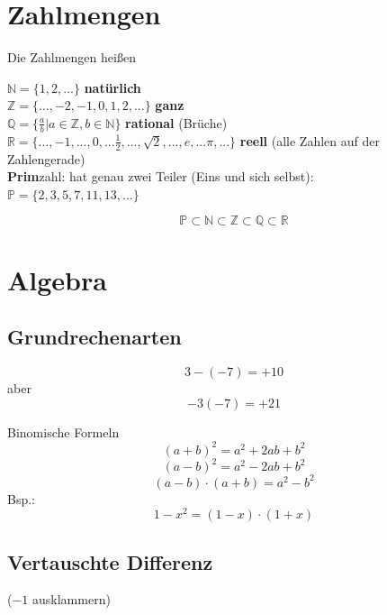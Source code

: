 \begin{multicols}{2}%

\section*{Zahlmengen}
\begin{definition*}{}{}
Die Zahlmengen heißen

$\mathbb{N} = \{1,2, ...\}$                                   \textbf{natürlich}\\
$\mathbb{Z} = \{..., -2, -1, 0, 1,2, ...\}$                   \textbf{ganz}\\
$\mathbb{Q} = \{\frac{a}b|a\in \mathbb{Z},b\in\mathbb{N}\}$   \textbf{rational} (Brüche)\\
$\mathbb{R} = \{..., -1, ..., 0, ... \frac12, ..., \sqrt{2}, ..., e, ... \pi, ...\}  $ \textbf{reell} (alle Zahlen auf der Zahlengerade)\\

\textbf{Prim}zahl: hat genau zwei Teiler (Eins und sich selbst):\\ $\mathbb{P} = \{2, 3, 5, 7, 11, 13, ...\}$
\end{definition*}

$$\mathbb{P} \subset \mathbb{N} \subset \mathbb{Z} \subset \mathbb{Q} \subset \mathbb{R}$$


\hrulefill%

\section*{Algebra}

\subsection*{Grundrechenarten}
$$3-(-7) = +10$$
aber
$$-3(-7) = +21$$

\begin{gesetz*}{Binomische Formeln}{}
$$(a+b)^2 = a^2+2ab + b^2$$%
$$(a-b)^2=a^2-2ab+b^2$$%
$$(a-b)\cdot(a+b) = a^2 - b^2$$
Bsp.:
$$1-x^2 = (1-x)\cdot{}(1+x)$$
\end{gesetz*}

\subsection*{Vertauschte Differenz}
($-1$ ausklammern)


\end{multicols}
